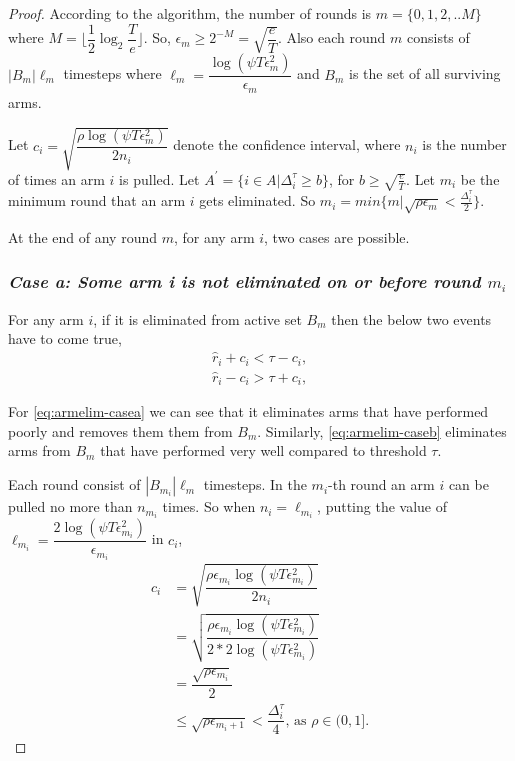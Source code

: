 \begin{proof}

According to the algorithm, the number of rounds is $m=\lbrace 0,1,2,.. M\rbrace $ where $M=\big\lfloor \dfrac{1}{2}\log_{2} \dfrac{T}{e}\big\rfloor$. So, $\epsilon_{m}\geq 2^{-M} = \sqrt{\dfrac{e}{T}}$. Also each round $m$ consists of $|B_{m}|\ell_{m}$ timesteps where $\ell_{m} = \dfrac{\log(\psi T \epsilon_{m}^{2})}{\epsilon_{m}}$ and $B_{m}$ is the set of all surviving arms. 

Let $c_{i} = \sqrt{\dfrac{\rho\log{(\psi T\epsilon_{m}^{2})}}{2 n_{i}}}$ denote the confidence interval, where $n_{i}$ is the number of times an arm $i$ is pulled. Let $A^{'}=\lbrace i\in A|\Delta_{i}^{\tau}\geq b\rbrace$, for $b\geq \sqrt{\frac{e}{T}}$. Let $m_{i}$ be the minimum round that an arm $i$ gets eliminated. So $m_{i}=min\lbrace m| \sqrt{\rho\epsilon_{m}}<\frac{\Delta_{i}^{\tau}}{2}\rbrace$. 

At the end of any round $m$, for any arm $i$, two cases are possible.

\subsubsection{\textit{Case a: Some arm i is not eliminated on or before round $m_{i}$}}
For any arm $i$, if it is eliminated from active set $B_{m}$ then the below two events have to come true,
\begin{align}
\hat{r}_{i} + c_{i} < \tau - c_{i}, \label{eq:armelim-casea}\\
\hat{r}_{i} - c_{i} > \tau + c_{i}, \label{eq:armelim-caseb}
\end{align}

For \ref{eq:armelim-casea} we can see that it eliminates arms that have performed poorly and removes them them from $B_{m}$. Similarly, \ref{eq:armelim-caseb} eliminates arms from $B_{m}$ that have performed very well compared to threshold $\tau$.

Each round consist of $|B_{m_{i}}|\ell_{m}$ timesteps. In the $m_{i}$-th round an arm $i$ can be pulled no more than $n_{m_{i}}$ times. So when $n_{i}=\ell_{m_{i}}$, putting the value of $\ell_{m_{i}}=\dfrac{2\log{(\psi T\epsilon_{m_{i}}^{2})}}{\epsilon_{m_{i}}}$ in $c_{i}$, 
\begin{align*}
c_{i}&=\sqrt{\dfrac{\rho\epsilon_{m_{i}}\log (\psi T\epsilon_{m_{i}}^{2})}{2 n_{i}}}\\
&=\sqrt{\dfrac{\rho\epsilon_{m_{i}}\log (\psi T\epsilon_{m_{i}}^{2})}{2*2 \log(\psi T\epsilon_{m_{i}}^{2})}}\\
& =\dfrac{\sqrt{\rho\epsilon_{m_{i}}}}{2}\\
& \leq \sqrt{\rho\epsilon_{m_{i}+1}} < \dfrac{\Delta_{i}^{\tau}}{4} \text{, as }\rho\in (0,1].
\end{align*}


\end{proof}
